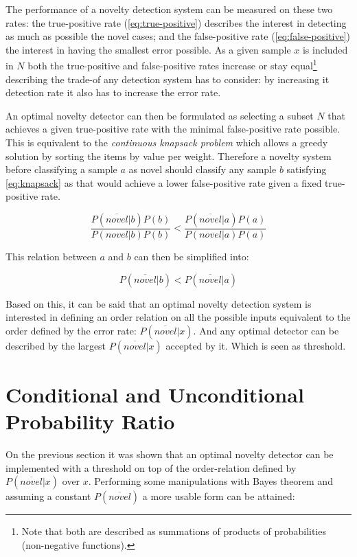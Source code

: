 The performance of a novelty detection system can be measured on these two
rates: the true-positive rate (\autoref{eq:true-positive}) describes the
interest in detecting as much as possible the novel cases;
and the false-positive rate (\autoref{eq:false-positive}) the interest in
having the smallest error possible.
As a given sample $x$ is included in $N$ both the true-positive and
false-positive rates increase or stay equal\footnote{
Note that both are described as summations of products of probabilities
(non-negative functions).} describing the trade-of any detection system
has to consider: by increasing it detection rate it also has to increase
the error rate.

An optimal novelty detector can then be formulated as selecting a subset $N$
that achieves a given true-positive rate with the minimal false-positive
rate possible. This is equivalent to the \emph{continuous knapsack problem}
which allows a greedy solution by sorting the items by value per weight.
Therefore a novelty system before classifying a sample $a$ as novel should
classify any sample $b$ satisfying \autoref{eq:knapsack} as that would achieve
a lower false-positive rate given a fixed true-positive rate.

\begin{equation}
\label{eq:knapsack}
\frac{P(\overline{novel}|b)P(b)}{P(novel|b)P(b)} < \frac{P(\overline{novel}|a)P(a)}{P(novel|a)P(a)}
\end{equation}

This relation between $a$ and $b$ can then be simplified into:

\begin{equation}
P(\overline{novel}|b) < P(\overline{novel}|a)
\end{equation}


Based on this, it can be said that an optimal novelty detection system is
interested in defining an order relation on all the possible inputs equivalent
to the order defined by the error rate: $P(\overline{novel}|x)$.
And any optimal detector can be described by the largest $P(\overline{novel}|x)$
accepted by it. Which is seen as threshold.


\section{Conditional and Unconditional Probability Ratio}

On the previous section it was shown that an optimal novelty detector can be
implemented with a threshold on top of the order-relation defined by
$P(\overline{novel}|x)$ over $x$. Performing some manipulations with
Bayes theorem and assuming a constant $P(\overline{novel})$ a more usable
form can be attained:

